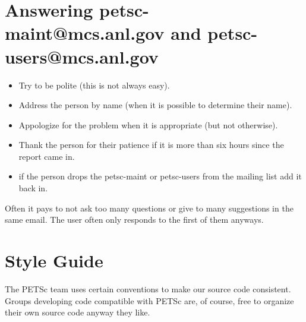 \documentclass[twoside,12pt]{../sty/report_petsc}
\begin{document}
\tableofcontents

\chapter{Answering petsc-maint@mcs.anl.gov and petsc-users@mcs.anl.gov}

\begin{itemize}
\item Try to be polite (this is not always easy).
\item Address the person by name (when it is possible to determine their name).
\item Appologize for the problem when it is appropriate (but not otherwise).
\item Thank the person for their patience if it is more than six hours since the report came in.
\item if the person drops the petsc-maint or petsc-users from the mailing list add it back in.
\end{itemize}

Often it pays to not ask too many questions or give to many suggestions in the same email. The user often only responds to the first of them anyways.

\chapter{Style Guide}

The PETSc team uses certain conventions to make our source code consistent. Groups
developing code compatible with PETSc are, of course, free to organize their
own source code anyway they like.
\end{document}
